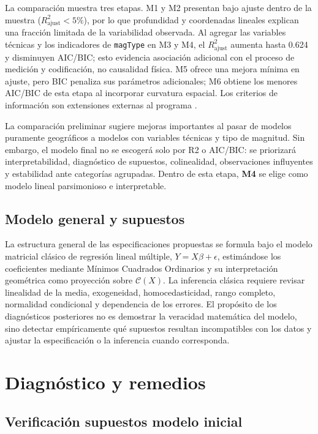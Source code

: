 \documentclass{style}
\newcommand{\var}[1]{\texttt{#1}}
\begin{document}
La comparación muestra tres etapas. M1 y M2 presentan bajo ajuste dentro de la muestra ($R^2_{\text{ajust}}<5\%$), por lo que profundidad y coordenadas lineales explican una fracción limitada de la variabilidad observada. Al agregar las variables técnicas y los indicadores de \var{magType} en M3 y M4, el $R^2_{\text{ajust}}$ aumenta hasta 0.624 y disminuyen AIC/BIC; esto evidencia asociación adicional con el proceso de medición y codificación, no causalidad física. M5 ofrece una mejora mínima en ajuste, pero BIC penaliza sus parámetros adicionales; M6 obtiene los menores AIC/BIC de esta etapa al incorporar curvatura espacial. Los criterios de información son extensiones externas al programa \cite{akaike1974,schwarz1978}.

La comparación preliminar sugiere mejoras importantes al pasar de modelos puramente geográficos a modelos con variables técnicas y tipo de magnitud. Sin embargo, el modelo final no se escogerá solo por R2 o AIC/BIC: se priorizará interpretabilidad, diagnóstico de supuestos, colinealidad, observaciones influyentes y estabilidad ante categorías agrupadas. Dentro de esta etapa, \textbf{M4} se elige como modelo lineal parsimonioso e interpretable.

\subsection{Modelo general y supuestos}

La estructura general de las especificaciones propuestas se formula bajo el modelo matricial clásico de regresión lineal múltiple, $Y = X\beta + \epsilon$, estimándose los coeficientes mediante Mínimos Cuadrados Ordinarios y su interpretación geométrica como proyección sobre $\mathcal{C}(X)$. La inferencia clásica requiere revisar linealidad de la media, exogeneidad, homocedasticidad, rango completo, normalidad condicional y dependencia de los errores. El propósito de los diagnósticos posteriores no es demostrar la veracidad matemática del modelo, sino detectar empíricamente qué supuestos resultan incompatibles con los datos y ajustar la especificación o la inferencia cuando corresponda.



\section{Diagnóstico y remedios}

\subsection{Verificación supuestos modelo inicial}
\end{document}
